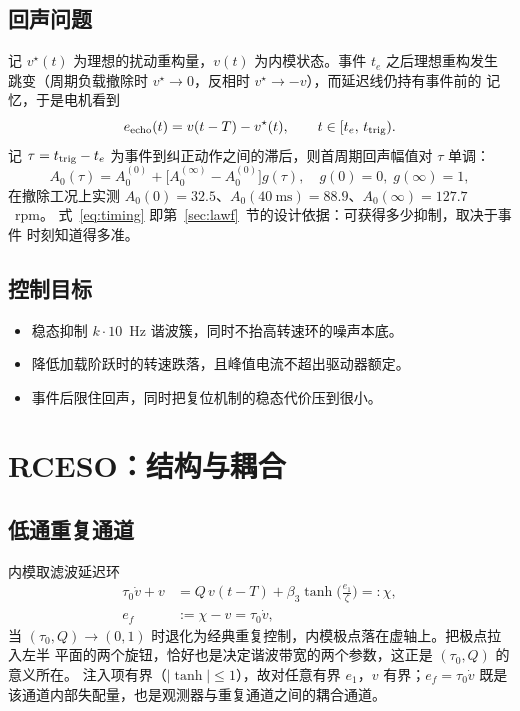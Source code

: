 \documentclass[journal]{IEEEtran}
\theoremstyle{remark}
\newcommand{\ef}{e_f}
\newcommand{\st}{\operatorname{tanh}}
\begin{document}
\subsection{回声问题}
记 $v^\star(t)$ 为理想的扰动重构量，$v(t)$ 为内模状态。事件 $t_e$ 之后理想重构发生
跳变（周期负载撤除时 $v^\star\to0$，反相时 $v^\star\to-v$），而延迟线仍持有事件前的
记忆，于是电机看到
\begin{equation}
e_{\rm echo}(t)=v(t-T)-v^\star(t),\qquad t\in[t_e,\,t_{\rm trig}) .
\label{eq:echo}
\end{equation}
记 $\tau=t_{\rm trig}-t_e$ 为事件到纠正动作之间的滞后，则首周期回声幅值对 $\tau$ 单调：
\begin{equation}
A_0(\tau)=A_0^{(0)}+\big[A_0^{(\infty)}-A_0^{(0)}\big]g(\tau),\quad g(0)=0,\; g(\infty)=1,
\label{eq:timing}
\end{equation}
在撤除工况上实测 $A_0(0)=32.5$、$A_0(40~\mathrm{ms})=88.9$、$A_0(\infty)=127.7$~rpm。
式~\eqref{eq:timing} 即第~\ref{sec:lawf}~节的设计依据：可获得多少抑制，取决于事件
时刻知道得多准。

\subsection{控制目标}
\begin{itemize}
\item[目标1] 稳态抑制 $k\cdot 10$~Hz 谐波簇，同时不抬高转速环的噪声本底。
\item[目标2] 降低加载阶跃时的转速跌落，且峰值电流不超出驱动器额定。
\item[目标3] 事件后限住回声，同时把复位机制的稳态代价压到很小。
\end{itemize}

\section{RCESO：结构与耦合}\label{sec:rceso}
\subsection{低通重复通道}
内模取滤波延迟环
\begin{equation}
\begin{aligned}
\tau_0\dot v+v&=Q\,v(t-T)+\beta_3\st\!\Big(\frac{e_1}{\zeta}\Big)=:\chi,\\
\ef&:=\chi-v=\tau_0\dot v ,
\end{aligned}
\label{eq:rc}
\end{equation}
当 $(\tau_0,Q)\to(0,1)$ 时退化为经典重复控制，内模极点落在虚轴上。把极点拉入左半
平面的两个旋钮，恰好也是决定谐波带宽的两个参数，这正是 $(\tau_0,Q)$ 的意义所在。
注入项有界（$|\st|\le1$），故对任意有界 $e_1$，$v$ 有界；$\ef=\tau_0\dot v$ 既是
该通道内部失配量，也是观测器与重复通道之间的耦合通道。
\end{document}
